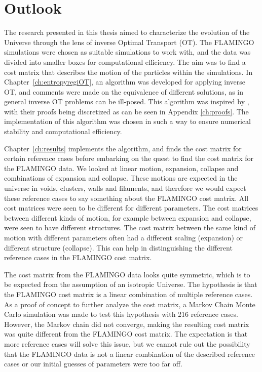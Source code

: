 
\chapter{Outlook}
The research presented in this thesis aimed to characterize the evolution of the Universe through the lens of inverse Optimal Transport (OT). The FLAMINGO simulations were chosen as suitable simulations to work with, and the data was divided into smaller boxes for computational efficiency. The aim was to find a cost matrix that describes the motion of the particles within the simulations. In Chapter~\ref{ch:entropyregiOT}, an algorithm was developed for applying inverse OT, and comments were made on the equivalence of different solutions, as in general inverse OT problems can be ill-posed. This algorithm was inspired by \citet{ma2021}, with their proofs being discretized as can be seen in Appendix \ref{ch:proofs}. The implementation of this algorithm was chosen in such a way to ensure numerical stability and computational efficiency. \par 
Chapter~\ref{ch:results} implements the algorithm, and finds the cost matrix for certain reference cases before embarking on the quest to find the cost matrix for the FLAMINGO data. We looked at linear motion, expansion, collapse and combinations of expansion and collapse. These motions are expected in the universe in voids, clusters, walls and filaments, and therefore we would expect these reference cases to say something about the FLAMINGO cost matrix. All cost matrices were seen to be different for different parameters. The cost matrices between different kinds of motion, for example between expansion and collapse, were seen to have different structures. The cost matrix between the same kind of motion with different parameters often had a different scaling (expansion) or different structure (collapse). This can help in distinguishing the different reference cases in the FLAMINGO cost matrix. \par 
The cost matrix from the FLAMINGO data looks quite symmetric, which is to be expected from the assumption of an isotropic Universe. The hypothesis is that the FLAMINGO cost matrix is a linear combination of multiple reference cases. As a proof of concept to further analyze the cost matrix, a Markov Chain Monte Carlo simulation was made to test this hypothesis with 216 reference cases. However, the Markov chain did not converge, making the resulting cost matrix was quite different from the FLAMINGO cost matrix. The expectation is that more reference cases will solve this issue, but we cannot rule out the possibility that the FLAMINGO data is not a linear combination of the described reference cases or our initial guesses of parameters were too far off.

